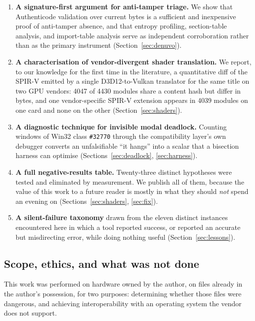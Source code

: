 \begin{enumerate}
\item \textbf{A signature-first argument for anti-tamper triage.} We show that
      Authenticode validation over current bytes is a sufficient and inexpensive
      proof of anti-tamper absence, and that entropy profiling, section-table
      analysis, and import-table analysis serve as independent corroboration
      rather than as the primary instrument (Section~\ref{sec:denuvo}).
\item \textbf{A characterisation of vendor-divergent shader translation.} We
      report, to our knowledge for the first time in the literature, a
      quantitative diff of the SPIR-V emitted by a single D3D12-to-Vulkan
      translator for the same title on two GPU vendors: 4047 of 4430 modules
      share a content hash but differ in bytes, and one vendor-specific SPIR-V
      extension appears in 4039 modules on one card and none on the other
      (Section~\ref{sec:shaders}).
\item \textbf{A diagnostic technique for invisible modal deadlock.} Counting
      windows of Win32 class \verb|#32770| through the compatibility layer's own
      debugger converts an unfalsifiable ``it hangs'' into a scalar that a
      bisection harness can optimise (Sections~\ref{sec:deadlock},
      \ref{sec:harness}).
\item \textbf{A full negative-results table.} Twenty-three distinct hypotheses
      were tested and eliminated by measurement. We publish all of them, because
      the value of this work to a future reader is mostly in what they should
      \emph{not} spend an evening on (Sections~\ref{sec:shaders},
      \ref{sec:fix}).
\item \textbf{A silent-failure taxonomy} drawn from the eleven distinct instances
      encountered here in which a tool reported success, or reported an accurate
      but misdirecting error, while doing nothing useful
      (Section~\ref{sec:lessons}).
\end{enumerate}

\subsection{Scope, ethics, and what was not done}
\label{sec:ethics}

This work was performed on hardware owned by the author, on files already in the
author's possession, for two purposes: determining whether those files were
dangerous, and achieving interoperability with an operating system the vendor
does not support.

